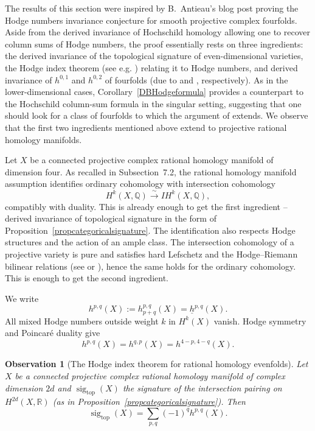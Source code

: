 \documentclass{amsart}
\theoremstyle{plain}
\newtheorem{obs}[prop]{Observation}
\theoremstyle{definition}
\newcommand{\bbQ}{\mathbb{Q}}
\DeclareMathOperator{\sig}{sig}
\begin{document}
The results of this section were inspired by B.~Antieau's blog post \cite{Ant26} proving the Hodge numbers invariance conjecture for smooth projective complex fourfolds. Aside from the derived invariance of Hochschild homology allowing one to recover column sums of Hodge numbers, the proof essentially rests on three ingredients:
the derived invariance of the topological signature of even-dimensional varieties, the Hodge index theorem (see e.g. \cite[Theorem 6.33]{Voi02}) relating it to Hodge numbers, and derived invariance of $h^{0,1}$ and $h^{0,2}$ of fourfolds (due to \cite{PS11} and \cite{Abu17}, respectively). 
As in the lower-dimensional cases, Corollary~\ref{DBHodgeformula} provides a counterpart to the Hochschild column-sum formula in the singular setting, suggesting that one should look for a class of fourfolds to which the argument of \cite{Ant26} extends.
We observe that the first two ingredients mentioned above extend to projective rational homology manifolds.

Let $X$ be a connected projective complex rational homology manifold of dimension four. As recalled in Subsection~7.2, the rational homology manifold assumption identifies ordinary cohomology with intersection cohomology
\[
H^k(X,\bbQ)\xrightarrow{\sim}IH^k(X,\bbQ),
\]
compatibly with duality. This is already enough to get the first ingredient -- derived invariance of topological signature in the form of Proposition~\ref{propcategoricalsignature}.
The identification also respects Hodge structures and the action of an ample class. The intersection cohomology of a projective variety is pure and satisfies hard Lefschetz and the Hodge--Riemann bilinear relations (see
\cite[\S1.9, items~1--2, and Theorem~5.2.1]{dCM09} or \cite[Theorem~2.2.3]{dCM05}), hence the same holds for the ordinary cohomology. This is enough to get the second ingredient.

We write
\begin{equation}\label{puritynotation}
h^{p,q}(X):=h_{p+q}^{p,q}(X)=\underline h^{p,q}(X).
\end{equation}
All mixed Hodge numbers outside weight $k$ in $H^k(X)$ vanish. Hodge symmetry and Poincar\'e duality give
\[
h^{p,q}(X)=h^{q,p}(X)=h^{4-p,4-q}(X).
\]

\begin{obs}[The Hodge index theorem for rational homology evenfolds]
Let $X$ be a connected projective complex rational homology manifold of complex dimension $2d$ and $\sig_{\mathrm{top}}(X)$ the signature of the intersection pairing on $H^{2d}(X, \mathbb{R})$ (as in Proposition~\ref{propcategoricalsignature}). Then 
\[
\sig_{\mathrm{top}}(X)=\sum_{p,q}(-1)^q h^{p,q}(X).
\]
\end{obs}
\end{document}
